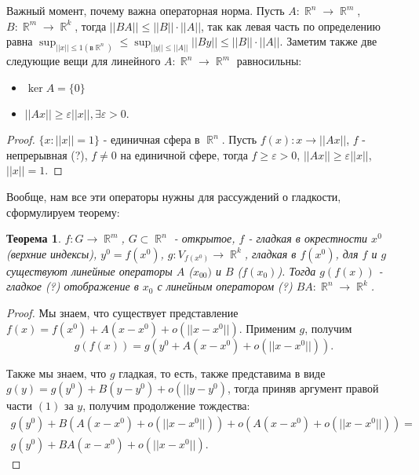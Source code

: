 \documentclass[a4paper,100pt]{article}
\theoremstyle{indented}
\newtheorem{theorem}{Теорема}
\theoremstyle{definition}
\theoremstyle{remark}
\DeclareMathOperator{\RR}{\mathbb{R}}
\begin{document}
Важный момент, почему важна операторная норма. Пусть $A:\RR^n\rightarrow \RR^m$, $B:\RR^m\rightarrow \RR^k$, тогда $||BA||\leq ||B||\cdot||A||$, так как левая часть по определению равна $\sup_{||x||\leq 1 (в \RR^n)}\leq \sup_{||y||\leq||A||}||By||\leq ||B||\cdot||A||$. Заметим также две следующие вещи для линейного $A:\RR^n\rightarrow \RR^m$ равносильны: \ 

\begin{itemize}
    \item $\ker A=\{0\}$
    \item $||Ax||\geq \varepsilon ||x||, \exists \varepsilon >0$. 
\end{itemize}

\begin{proof}
    $\{x:||x||=1\}$ - единичная сфера в $\RR^n$. Пусть $f(x):x\rightarrow ||Ax||$, $f$ - непрерывная (?), $f\neq 0$ на единичной сфере, тогда $f\geq \varepsilon >0$, $||Ax||\geq \varepsilon||x||$, $||x||=1$. 
\end{proof}

Вообще, нам все эти операторы нужны для рассуждений о гладкости, сформулируем теорему: \\ 

\begin{theorem}
    $f: G\rightarrow \RR^m$, $G\subset \RR^n$ - открытое, $f$ - гладкая в окрестности $x^0$ (верхние индексы), $y^0=f(x^0)$, $g:V_{f(x^0)}\rightarrow \RR^k$, гладкая в $f(x^0)$, для $f$ и $g$ существуют линейные операторы $A$ ($x_00)$ и $B$ ($f(x_0)$). Тогда $g(f(x))$ - гладкое (?) отображение в $x_0$ с линейным оператором (?) $BA:\RR^n\rightarrow \RR^k$. 
\end{theorem}

\begin{proof}
    Мы знаем, что существует представление $f(x)=f(x^0)+A(x-x^0)+o(||x-x^0||)$. Применим $g$, получим 
    \begin{equation}
        g(f(x))=g(y^0+A(x-x^0)+o(||x-x^0||)).
    \end{equation}
        
    Также мы знаем, что $g$ гладкая, то есть, также представима в виде $g(y)=g(y^0)+B(y-y^0)+o(||y-y^0)$, тогда приняв аргумент правой части $(1)$ за $y$, получим продолжение тождества: 
    \begin{equation}
        \begin{split}
            g(y^0)+B(A(x-x^0)+o(||x-x^0||))+o(A(x-x^0)+o(||x-x^0||)) = \\ 
            g(y^0)+BA(x-x^0)+o(||x-x^0||).
        \end{split}
\end{equation}
\end{proof}
\end{document}
